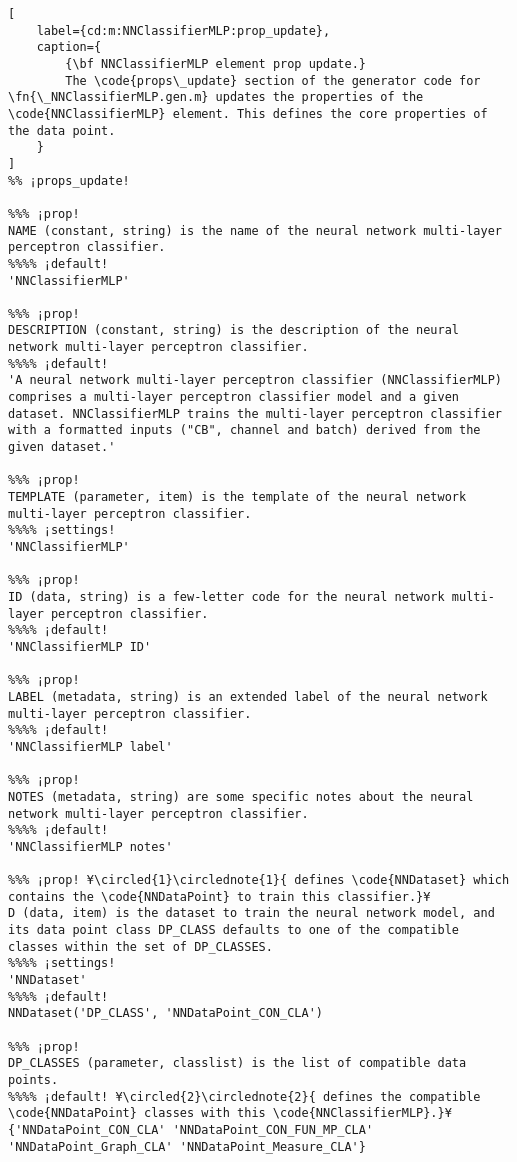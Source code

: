 \documentclass{tufte-handout}
\begin{document}
\begin{lstlisting}[
	label={cd:m:NNClassifierMLP:prop_update},
	caption={
		{\bf NNClassifierMLP element prop update.}
		The \code{props\_update} section of the generator code for \fn{\_NNClassifierMLP.gen.m} updates the properties of the \code{NNClassifierMLP} element. This defines the core properties of the data point.
	}
]
%% ¡props_update!

%%% ¡prop!
NAME (constant, string) is the name of the neural network multi-layer perceptron classifier.
%%%% ¡default!
'NNClassifierMLP'

%%% ¡prop!
DESCRIPTION (constant, string) is the description of the neural network multi-layer perceptron classifier.
%%%% ¡default!
'A neural network multi-layer perceptron classifier (NNClassifierMLP) comprises a multi-layer perceptron classifier model and a given dataset. NNClassifierMLP trains the multi-layer perceptron classifier with a formatted inputs ("CB", channel and batch) derived from the given dataset.'

%%% ¡prop!
TEMPLATE (parameter, item) is the template of the neural network multi-layer perceptron classifier.
%%%% ¡settings!
'NNClassifierMLP'

%%% ¡prop!
ID (data, string) is a few-letter code for the neural network multi-layer perceptron classifier.
%%%% ¡default!
'NNClassifierMLP ID'

%%% ¡prop!
LABEL (metadata, string) is an extended label of the neural network multi-layer perceptron classifier.
%%%% ¡default!
'NNClassifierMLP label'

%%% ¡prop!
NOTES (metadata, string) are some specific notes about the neural network multi-layer perceptron classifier.
%%%% ¡default!
'NNClassifierMLP notes'

%%% ¡prop! ¥\circled{1}\circlednote{1}{ defines \code{NNDataset} which contains the \code{NNDataPoint} to train this classifier.}¥
D (data, item) is the dataset to train the neural network model, and its data point class DP_CLASS defaults to one of the compatible classes within the set of DP_CLASSES.
%%%% ¡settings!
'NNDataset'
%%%% ¡default!
NNDataset('DP_CLASS', 'NNDataPoint_CON_CLA')

%%% ¡prop!
DP_CLASSES (parameter, classlist) is the list of compatible data points. 
%%%% ¡default! ¥\circled{2}\circlednote{2}{ defines the compatible \code{NNDataPoint} classes with this \code{NNClassifierMLP}.}¥
{'NNDataPoint_CON_CLA' 'NNDataPoint_CON_FUN_MP_CLA' 'NNDataPoint_Graph_CLA' 'NNDataPoint_Measure_CLA'}


\end{lstlisting}
\end{document}
